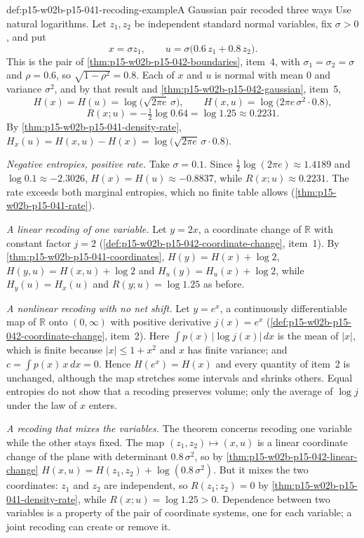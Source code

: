 \begin{hbexample}{def:p15-w02b-p15-041-recoding-example}{A Gaussian pair recoded three ways}
Use natural logarithms. Let \(z_1,z_2\) be independent standard normal
variables, fix \(\sigma>0\), and put
\[
 x=\sigma z_1,\qquad u=\sigma\bigl(0.6\,z_1+0.8\,z_2\bigr).
\]
This is the pair of \cref{thm:p15-w02b-p15-042-boundaries}, item~4,
with \(\sigma_1=\sigma_2=\sigma\) and \(\rho=0.6\), so
\(\sqrt{1-\rho^2}=0.8\). Each of \(x\) and \(u\) is normal with mean
\(0\) and variance \(\sigma^2\), and by that result and
\cref{thm:p15-w02b-p15-042-gaussian}, item~5,
\[
 H(x)=H(u)=\log\bigl(\sqrt{2\pi e}\,\sigma\bigr),\qquad
 H(x,u)=\log\bigl(2\pi e\,\sigma^2\cdot0.8\bigr),
\]
\[
 R(x;u)=-\tfrac12\log0.64=\log1.25\approx0.2231 .
\]
By \cref{thm:p15-w02b-p15-041-density-rate},
\(H_x(u)=H(x,u)-H(x)=\log\bigl(\sqrt{2\pi e}\,\sigma\cdot0.8\bigr)\).

\emph{Negative entropies, positive rate.} Take \(\sigma=0.1\). Since
\(\tfrac12\log(2\pi e)\approx1.4189\) and \(\log0.1\approx-2.3026\),
\(H(x)=H(u)\approx-0.8837\), while \(R(x;u)\approx0.2231\). The rate
exceeds both marginal entropies, which no finite table allows
(\cref{thm:p15-w02b-p15-041-rate}).

\emph{A linear recoding of one variable.} Let \(y=2x\), a coordinate
change of \(\mathbb R\) with constant factor \(j=2\)
(\cref{def:p15-w02b-p15-042-coordinate-change}, item~1). By
\cref{thm:p15-w02b-p15-041-coordinates}, \(H(y)=H(x)+\log2\),
\(H(y,u)=H(x,u)+\log2\) and \(H_u(y)=H_u(x)+\log2\), while
\(H_y(u)=H_x(u)\) and \(R(y;u)=\log1.25\) as before.

\emph{A nonlinear recoding with no net shift.} Let \(y=e^{x}\), a
continuously differentiable map of \(\mathbb R\) onto \((0,\infty)\)
with positive derivative \(j(x)=e^{x}\)
(\cref{def:p15-w02b-p15-042-coordinate-change}, item~2). Here
\(\int p(x)\,|\log j(x)|\,dx\) is the mean of \(|x|\), which is finite
because \(|x|\leq1+x^2\) and \(x\) has finite variance; and
\(c=\int p(x)\,x\,dx=0\). Hence \(H(e^{x})=H(x)\) and every quantity of
item~2 is unchanged, although the map stretches some intervals and
shrinks others. Equal entropies do not show that a recoding preserves
volume; only the average of \(\log j\) under the law of \(x\) enters.

\emph{A recoding that mixes the variables.} The theorem concerns
recoding one variable while the other stays fixed. The map
\((z_1,z_2)\mapsto(x,u)\) is a linear coordinate change of the plane with
determinant \(0.8\,\sigma^2\), so by
\cref{thm:p15-w02b-p15-042-linear-change}
\(H(x,u)=H(z_1,z_2)+\log(0.8\,\sigma^2)\). But it mixes the two
coordinates: \(z_1\) and \(z_2\) are independent, so
\(R(z_1;z_2)=0\) by \cref{thm:p15-w02b-p15-041-density-rate}, while
\(R(x;u)=\log1.25>0\). Dependence between two variables is a property of
the pair of coordinate systems, one for each variable; a joint
recoding can create or remove it.
\end{hbexample}

